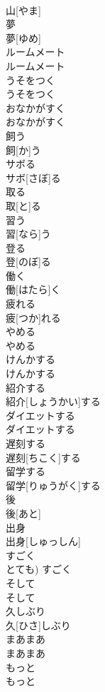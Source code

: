 \documentclass[8pt]{extreport}
\begin{document}
\begin{CJK}{UTF8}{min}
\\	山[やま]
\\	夢	
\\	夢[ゆめ]
\\	ルームメート	
\\	ルームメート
\\	うそをつく	
\\	うそをつく
\\	おなかがすく	
\\	おなかがすく
\\	飼う	
\\	飼[か]う
\\	サボる	
\\	サボ[さぼ]る
\\	取る	
\\	取[と]る
\\	習う	
\\	習[なら]う
\\	登る	
\\	登[のぼ]る
\\	働く	
\\	働[はたら]く
\\	疲れる	
\\	疲[つか]れる
\\	やめる	
\\	やめる
\\	けんかする	
\\	けんかする
\\	紹介する	
\\	紹介[しょうかい]する
\\	ダイエットする	
\\	ダイエットする
\\	遅刻する	
\\	遅刻[ちこく]する
\\	留学する	
\\	留学[りゅうがく]する
\\	後	
\\	後[あと]
\\	出身	
\\	出身[しゅっしん]
\\	すごく	
\\	とても)	すごく
\\	そして	
\\	そして
\\	久しぶり	
\\	久[ひさ]しぶり
\\	まあまあ	
\\	まあまあ
\\	もっと	
\\	もっと

\end{CJK}
\end{document}

